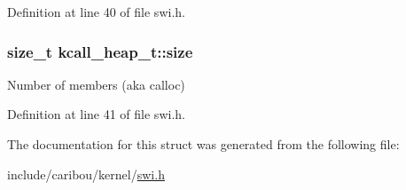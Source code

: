 Definition at line 40 of file swi.\-h.

\hypertarget{structkcall__heap__t_a4ace4b9692bb1da087cd484c5331fb67}{
\subsubsection[{size}]{\setlength{\rightskip}{0pt plus 5cm}size\-\_\-t kcall\-\_\-heap\-\_\-t\-::size}}\label{structkcall__heap__t_a4ace4b9692bb1da087cd484c5331fb67}
Number of members (aka calloc) 

Definition at line 41 of file swi.\-h.



The documentation for this struct was generated from the following file\-:\begin{DoxyCompactItemize}
\item 
include/caribou/kernel/\hyperlink{swi_8h}{swi.\-h}\end{DoxyCompactItemize}
